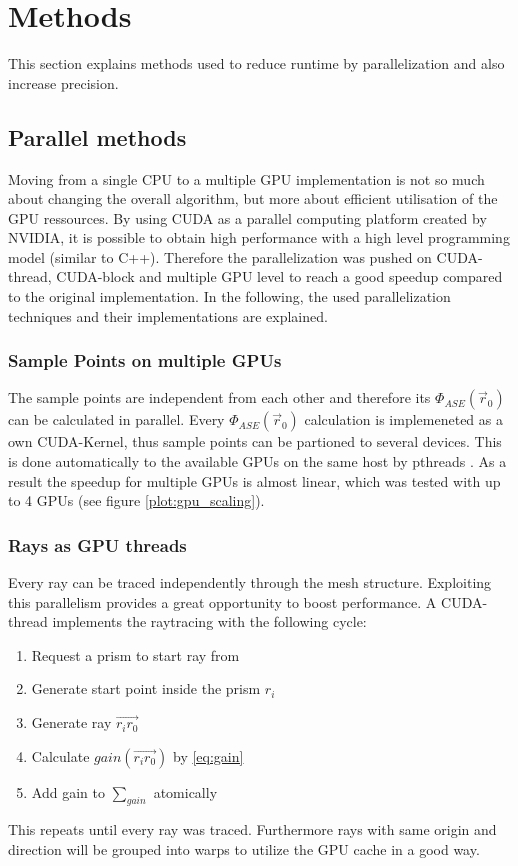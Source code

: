 \section{Methods}
This section explains methods used to reduce runtime by parallelization and also
increase precision.

\subsection{Parallel methods}
\label{subsec:parallel_methods}
Moving from a single CPU to a multiple
GPU implementation is not so much about changing the overall algorithm,
but more about efficient utilisation of the GPU ressources. 
By using CUDA as a parallel computing platform created by NVIDIA,
it is possible to obtain high performance with a high level 
programming model (similar to C++). Therefore the parallelization was pushed on CUDA-thread, 
CUDA-block and multiple GPU level to reach a good speedup compared to 
the original implementation.
In the following, the used parallelization
techniques and their implementations are explained.

\subsubsection{Sample Points on multiple GPUs}
The sample points are independent from each other
and therefore its $\Phi_{ASE}(\vec{r}_0)$ can be calculated in parallel. Every $\Phi_{ASE}(\vec{r}_0)$
calculation is implemeneted as a own CUDA-Kernel, thus sample points can be partioned 
to several devices. This is done automatically to the available GPUs on
the same host by pthreads \cite{pthreads}. As a result the speedup for multiple
GPUs is almost linear, which was tested with up to 4 GPUs (see figure \ref{plot:gpu_scaling}).
    
\subsubsection{Rays as GPU threads}
    Every ray can be traced independently through the mesh structure.
    Exploiting this parallelism provides a great opportunity to boost
    performance. A CUDA-thread implements the raytracing with the 
    following cycle:
    \begin{enumerate}
      \item Request a prism to start ray from
      \item Generate start point inside the prism $r_i$
      \item Generate ray $\overrightarrow{r_ir_0}$
      \item Calculate $gain(\overrightarrow{r_ir_0})$ by \eqref{eq:gain}
      \item Add gain to $\sum_{gain}$ atomically
    \end{enumerate}
    This repeats until every ray was traced. Furthermore rays with same
    origin and direction will be grouped into warps to utilize the
    GPU cache in a good way.

